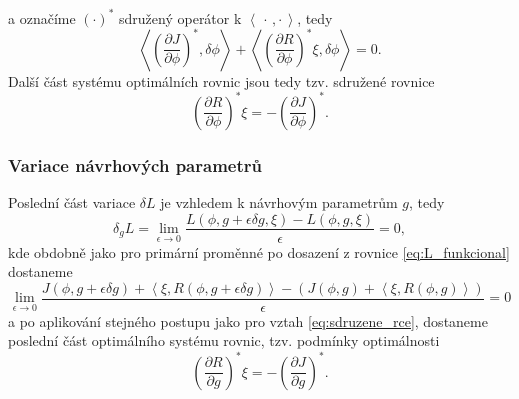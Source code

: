 a označíme $ (\cdot)^* $ sdružený operátor k $  \left\langle \, \cdot\,,\cdot \,  \right\rangle $, tedy
\begin{equation*}
\left\langle   \left(\frac{\partial J}{\partial \phi}\right)^* ,\delta\phi  \right\rangle
+  \left\langle \left(\dfrac{\partial R}{\partial \phi}\right)^* \xi ,  \delta\phi\right\rangle
=0.
\end{equation*}
Další část systému optimálních rovnic jsou tedy tzv. sdružené rovnice
\begin{equation}\label{eq:sdruzene_rce}
\left( \dfrac{\partial R}{\partial \phi} \right)^* \xi = 
- \left(\dfrac{\partial J}{\partial \phi}\right)^*.
\end{equation}

\subsubsection{Variace návrhových parametrů}

Poslední část variace $ \delta L $ je vzhledem k návrhovým parametrům $ g $, tedy
\begin{equation*}
\delta_g L =
\lim\limits_{\epsilon\rightarrow 0}
\dfrac{L(\phi,g+\epsilon\delta g,\xi)-L(\phi,g,\xi)}
{\epsilon}
=0,
\end{equation*}
kde obdobně jako pro primární proměnné po dosazení z rovnice \ref{eq:L_funkcional} dostaneme
\begin{equation*}
\lim\limits_{\epsilon\rightarrow0} \dfrac
{J(\phi, g+\epsilon\delta g) + 
	 \left\langle\xi , R(\phi, g+\epsilon\delta g)\right\rangle  -  (J(\phi, g) +  \left\langle\xi , R(\phi, g)\right\rangle)}
{\epsilon}
=0
\end{equation*}
a po aplikování stejného postupu jako pro vztah \ref{eq:sdruzene_rce}, dostaneme poslední část optimálního systému rovnic, tzv. podmínky optimálnosti
\begin{equation}\label{eq:podminky_optimalnosti}
\left( \dfrac{\partial R}{\partial g} \right)^* \xi = 
- \left(\dfrac{\partial J}{\partial g}\right)^*.
\end{equation}

